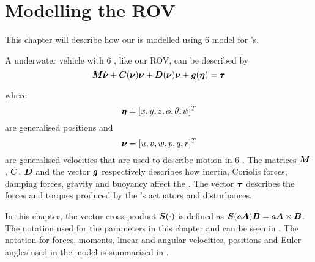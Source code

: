 \chapter{Modelling the ROV} \label{cha:modelling}
This chapter will describe how our \abbrROV is modelled using \citet{fossen2011} 6 \abbrDOF model for \abbrROV's.

A underwater vehicle with 6 \abbrDOF, like our ROV, can be described by
\begin{equation} \label{eq:model}
 \boldsymbol{M} \dot{\boldsymbol{\nu}} + \boldsymbol{C}(\boldsymbol{\nu})\boldsymbol{\nu} + \boldsymbol{D}(\boldsymbol{\nu})\boldsymbol{\nu} + \boldsymbol{g}(\boldsymbol{\eta}) = \boldsymbol{\tau}
\end{equation}
 
where
\begin{equation*}
  \boldsymbol{\eta} = [x, y, z, \phi, \theta, \psi]^T  
\end{equation*} are generalised positions and
\begin{equation*}
  \boldsymbol{\nu} = [u, v, w, p, q, r]^T 
\end{equation*}
are generalised velocities that are used to describe motion in 6 \abbrDOF. The matrices $\boldsymbol{M}$, $\boldsymbol{C}$, $\boldsymbol{D}$ and the vector $\boldsymbol{g}$ respectively describes how inertia, Coriolis forces, damping forces, gravity and buoyancy affect the \abbrROV. The vector $\boldsymbol{\tau}$ describes the forces and torques produced by the \abbrROV's actuators and disturbances.


 
In this chapter, the vector cross-product $\boldsymbol{S}(\cdot)$ is defined as $\boldsymbol{S}(a\boldsymbol{A}) \boldsymbol{B} = a\boldsymbol{A} \times \boldsymbol{B}$. The notation used for the parameters in this chapter and  can be seen in . The notation for forces, moments, linear and angular velocities, positions and Euler angles used in the model is summarised in .

